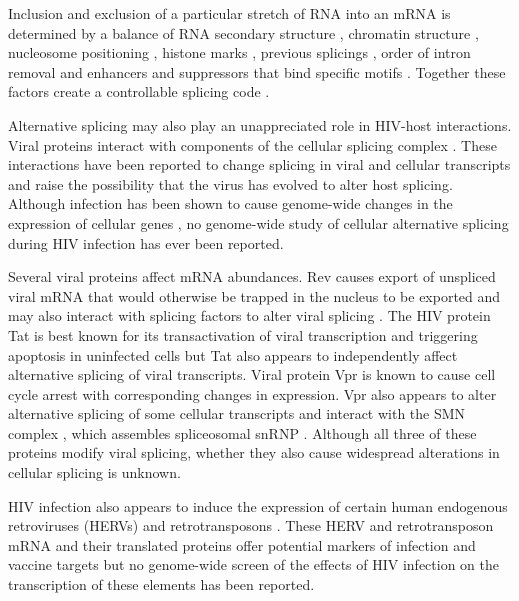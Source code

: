 \documentclass[../sherrill-Mix_thesis.tex]{subfiles}
\begin{document}
	Inclusion and exclusion of a particular stretch of RNA into an mRNA is determined by a balance of RNA secondary structure \citep{Buratti2004,Jablonski2008,Shepard2008}, chromatin structure \citep{Allo2009}, nucleosome positioning \citep{Tilgner2009}, histone marks \citep{Schwartz2009}, previous splicings \citep{Crabb2010}, order of intron removal \citep{Takahara2002,Mata2010} and enhancers \citep{Zahler1993} and suppressors \citep{Smith2000} that bind specific motifs \citep{Ule2006}. Together these factors create a controllable splicing code \citep{Barash2010,Xiong2011,Witten2011}.  

	Alternative splicing may also play an unappreciated role in HIV-host interactions. Viral proteins interact with components of the cellular splicing complex \citep{Tange1996,Berro2006,Jager2012}. These interactions have been reported to change splicing in viral \citep{Berro2006,Bohne2007,Jablonski2010} and cellular transcripts \citep{Kuramitsu2005,Hashizume2007} and raise the possibility that the virus has evolved to alter host splicing. Although infection has been shown to cause genome-wide changes in the expression of cellular genes \citep{Vahey2002,Wout2003,Mitchell2003,Rotger2010,Chang2011}, no genome-wide study of cellular alternative splicing during HIV infection has ever been reported.

	Several viral proteins affect mRNA abundances. Rev causes export of unspliced viral mRNA that would otherwise be trapped in the nucleus \citep{Legrain1989} to be exported \citep{Fischer1994,Pollard1998} and may also interact with splicing factors to alter viral splicing \citep{Tange1996}. The HIV protein Tat is best known for its transactivation of viral transcription \citep{Sodroski1985,Jones1994} and triggering apoptosis in uninfected cells \citep{McCloskey1997,Campbell2004} but Tat also appears to independently affect alternative splicing of viral transcripts\citep{Berro2006,Bohne2007,Jablonski2010,Miller2011}. Viral protein Vpr is known to cause cell cycle arrest \citep{Rogel1995} with corresponding changes in expression. Vpr also appears to alter alternative splicing of some cellular transcripts \citep{Kuramitsu2005,Hashizume2007} and interact with the SMN complex \citep{Jager2012}, which assembles spliceosomal snRNP \citep{Gubitz2004}. Although all three of these proteins modify viral splicing, whether they also cause widespread alterations in cellular splicing is unknown.

	HIV infection also appears to induce the expression of certain human endogenous retroviruses (HERVs) \citep{Contreras-Galindo2006,Laderoute2007,Contreras-Galindo2007,Contreras-Galindo2013,Bhardwaj2014,Vincendeau2015} and retrotransposons \citep{Jones2013}. These HERV and retrotransposon mRNA and their translated proteins offer potential markers of infection and vaccine targets \citep{Boller1997,Buescher2005,Garrison2007,Tandon2011,SenGupta2011,Jones2012} but no genome-wide screen of the effects of HIV infection on the transcription of these elements has been reported.
\end{document}
